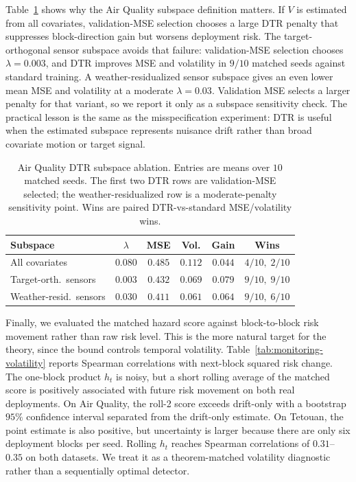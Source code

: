 \documentclass[conference]{IEEEtran}
\begin{document}
Table~\ref{tab:aq-subspace} shows why the Air Quality subspace definition matters. If $V$ is estimated from all covariates, validation-MSE selection chooses a large DTR penalty that suppresses block-direction gain but worsens deployment risk. The target-orthogonal sensor subspace avoids that failure: validation-MSE selection chooses $\lambda=0.003$, and DTR improves MSE and volatility in $9/10$ matched seeds against standard training. A weather-residualized sensor subspace gives an even lower mean MSE and volatility at a moderate $\lambda=0.03$. Validation MSE selects a larger penalty for that variant, so we report it only as a subspace sensitivity check. The practical lesson is the same as the misspecification experiment: DTR is useful when the estimated subspace represents nuisance drift rather than broad covariate motion or target signal.

\begin{table}[t]
\caption{Air Quality DTR subspace ablation. Entries are means over $10$ matched seeds. The first two DTR rows are validation-MSE selected; the weather-residualized row is a moderate-penalty sensitivity point. Wins are paired DTR-vs-standard MSE/volatility wins.}
\centering
\setlength{\tabcolsep}{3.5pt}
\scriptsize
\begin{tabular}{lccccc}
\toprule
Subspace & $\lambda$ & MSE & Vol. & Gain & Wins \\
\midrule
All covariates & $0.080$ & $0.485$ & $0.112$ & $0.044$ & $4/10,\;2/10$ \\
Target-orth.\ sensors & $0.003$ & $0.432$ & $0.069$ & $0.079$ & $9/10,\;9/10$ \\
Weather-resid.\ sensors & $0.030$ & $0.411$ & $0.061$ & $0.064$ & $9/10,\;6/10$ \\
\bottomrule
\end{tabular}
\label{tab:aq-subspace}
\end{table}

Finally, we evaluated the matched hazard score against block-to-block risk movement rather than raw risk level. This is the more natural target for the theory, since the bound controls temporal volatility. Table~\ref{tab:monitoring-volatility} reports Spearman correlations with next-block squared risk change. The one-block product $h_t$ is noisy, but a short rolling average of the matched score is positively associated with future risk movement on both real deployments. On Air Quality, the roll-2 score exceeds drift-only with a bootstrap $95\%$ confidence interval separated from the drift-only estimate. On Tetouan, the point estimate is also positive, but uncertainty is larger because there are only six deployment blocks per seed. Rolling $h_t$ reaches Spearman correlations of $0.31$--$0.35$ on both datasets. We treat it as a theorem-matched volatility diagnostic rather than a sequentially optimal detector.
\end{document}
